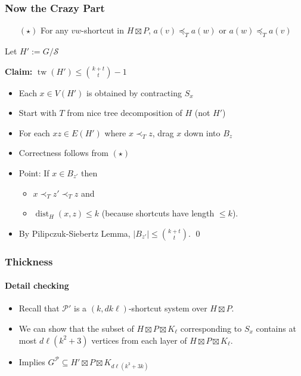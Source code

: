 \documentclass[xcolor=dvipsnames]{beamer}
\DeclareMathOperator{\tw}{tw}
\begin{document}
\begin{frame}
  \frametitle{Now the Crazy Part}

  \begin{itemize}
      \item[$(\star)$] For any $vw$-shortcut in $H\boxtimes P$, $a(v)\preceq_T a(w)$ or $a(w)\preceq_T a(v)$
  \end{itemize}

    \vspace{.5cm}
    Let $H':=G/\mathcal{S}$
    \vspace{.5cm}

    \textbf{Claim:} $\tw(H')\le\binom{k+t}{t}-1$\\
    \vspace{.5cm}
    \begin{itemize}
      \item<2-> Each $x\in V(H')$ is obtained by contracting $S_x$
      \item<3-> Start with $T$ from nice tree decomposition of $H$ (not $H'$)
      \item<4-> For each $xz\in E(H')$ where $x\prec_T z$, drag $x$ down into $B_z$
      \item<5-> Correctness follows from $(\star)$
      \item<6-> Point: If $x\in B_{z'}$ then
      \begin{itemize}
          \item $x\prec_T z'\prec_T z$ and
          \item $\mathop{dist}_{H}(x,z)\le k$ (because shortcuts have length $\le\!\!k$).
      \end{itemize}
      \item<7-> By Pilipczuk-Siebertz Lemma, $|B_{z'}|\le \binom{k+t}{t}$.
      \hfill{\qed}
    \end{itemize}
\end{frame}


\begin{frame}
  \frametitle{Thickness}
  \framesubtitle{Detail checking}

  \begin{itemize}
    \item Recall that $\mathcal{P'}$ is a $(k,dk\ell)$-shortcut system over $H\boxtimes P$.
    \item We can show that the subset of $H\boxtimes P\boxtimes K_{\ell}$ corresponding to $S_x$ contains at most $d\ell(k^2+3)$ vertices from each layer of $H\boxtimes P\boxtimes K_{\ell}$.
    \item Implies $G^{\mathcal{P}}\subseteq H'\boxtimes P\boxtimes K_{d\ell(k^3+3k)}$
  \end{itemize}
\end{frame}

\begin{frame}


\end{frame}


%
%
%
\end{document}
